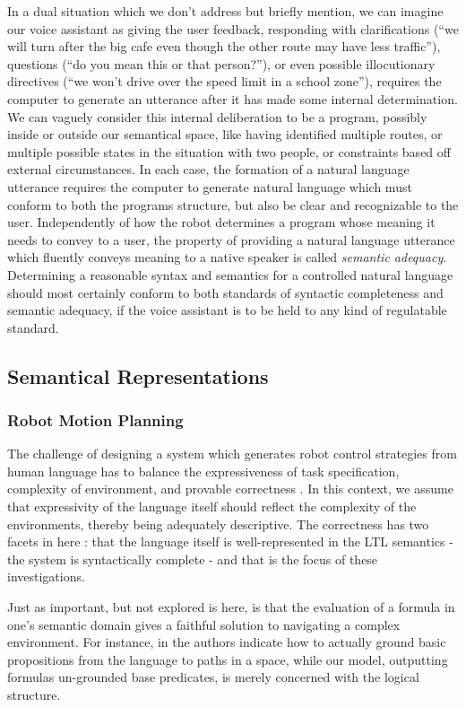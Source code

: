 \documentclass[a4paper, 11pt]{article}
\begin{document}
In a dual situation which we don't address but briefly mention, we can imagine
our voice assistant as giving the user feedback, responding with clarifications
(``we will turn after the big cafe even though the other route may have less
traffic''), questions (``do you mean this or that person?''), or even possible
illocutionary directives (``we won't drive over the speed limit in a school
zone''), requires the computer to generate an utterance after it has made some
internal determination. We can vaguely consider this internal deliberation to
be a program, possibly inside or outside our semantical space, like
having identified multiple routes, or multiple possible states in the situation
with two people, or constraints based off external circumstances. In each case,
the formation of a natural language utterance requires the computer to generate
natural language which must conform to both the programs structure, but also be
clear and recognizable to the user. Independently of how the robot determines a
program whose meaning it needs to convey to a user, the property of providing a
natural language utterance which fluently conveys meaning to a native speaker is
called \emph{semantic adequacy}. Determining a reasonable syntax and semantics
for a controlled natural language should most certainly conform to both
standards of syntactic completeness and semantic adequacy, if the voice assistant
is to be held to any kind of regulatable standard.

\subsection{Semantical Representations}

\subsubsection{Robot Motion Planning}

The challenge of designing a system which generates robot control strategies
from human language has to balance the expressiveness of task specification,
complexity of environment, and provable correctness \cite{4141034}. In this
context, we assume that expressivity of the language itself should reflect the
complexity of the environments, thereby being adequately descriptive. The
correctness has two facets in here : that the language itself is
well-represented in the LTL semantics - the system is syntactically complete -
and that is the focus of these investigations.

Just as important, but not explored is here, is that the evaluation of a formula
in one's semantic domain gives a faithful solution to navigating a complex
environment. For instance, in \cite{plaku2016motion} the authors indicate how to
actually ground basic propositions from the language to paths in a space, while
our model, outputting formulas un-grounded base predicates, is merely concerned
with the logical structure.
\end{document}
